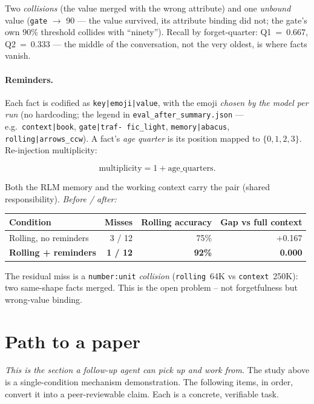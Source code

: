 \documentclass{article}
\begin{document}
Two \emph{collisions} (the value merged with the wrong attribute) and one
\emph{unbound} value (\texttt{gate} $\rightarrow$ 90 --- the value survived, its
attribute binding did not; the gate's own 90\% threshold collides with ``ninety'').
Recall by forget-quarter: Q1~=~0.667, Q2~=~0.333 --- the middle of the conversation,
not the very oldest, is where facts vanish.

\paragraph{Reminders.} Each fact is codified as \texttt{key|emoji|value}, with the
emoji \emph{chosen by the model per run} (no hardcoding; the legend in
\texttt{eval\_after\_summary.json} --- e.g.\ \texttt{context|book}, \texttt{gate|traf-
fic\_light}, \texttt{memory|abacus}, \texttt{rolling|arrows\_ccw}). A fact's
\emph{age quarter} is its position
mapped to $\{0,1,2,3\}$. Re-injection multiplicity:

\[
\text{multiplicity} = 1 + \text{age\_quarters}.
\]

Both the RLM memory and the working context carry the pair (shared responsibility).
\emph{Before / after:}

\begin{center}
\begin{tabular}{@{}lrrr@{}}
\toprule
Condition & Misses & Rolling accuracy & Gap vs full context \\
\midrule
Rolling, no reminders & 3 / 12 & 75\% & +0.167 \\
\textbf{Rolling + reminders} & \textbf{1 / 12} & \textbf{92\%} & \textbf{0.000} \\
\bottomrule
\end{tabular}
\end{center}

The residual miss is a \texttt{number:unit} \emph{collision} (\texttt{rolling}~64K vs
\texttt{context}~250K): two same-shape facts merged. This is the open problem -- not
forgetfulness but wrong-value binding.

\section{Path to a paper}
\label{sec:roadmap}

\emph{This is the section a follow-up agent can pick up and work from.} The study above
is a single-condition mechanism demonstration. The following items, in order, convert
it into a peer-reviewable claim. Each is a concrete, verifiable task.
\end{document}
